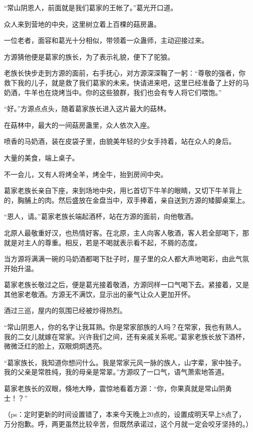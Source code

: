 \begin{this_body}
“常山阴恩人，前面就是我们葛家的王帐了。”葛光开口道。

众人来到营地的中央，这里树立着上百棵的菇房蛊。

一位老者，面容和葛光十分相似，带领着一众蛊师，主动迎接过来。

方源猜他便是葛家的族长，为了表示礼貌，便下了驼狼。

老族长快步走到方源的面前，右手抚心，对方源深深鞠了一躬：“尊敬的强者，你救下我的儿子，就是救了我们葛家的未来。快请进来吧，这里已经准备了上好的马奶酒，牛羊也在烧烤当中。你的这些狼群，我们也会有专人将它们喂饱。”

“好。”方源点点头，随着葛家族长进入这片最大的菇林。

在菇林中，最大的一间菇房蛊里，众人依次入座。

喷香的马奶酒，装在皮袋子里，由貌美年轻的少女手持着，站在众人的身后。

大量的美食，端上桌子。

不一会儿，又有人将烤全羊，烤全牛，抬到房间中央。

葛家老族长亲自下座，来到场地中央，用匕首切下牛羊的眼睛，又切下牛羊背上的，胸脯上的肉。然后盛放在金盘当中，双手捧着，亲自送到方源的矮脚桌案上。

“恩人，请。”葛家老族长端起酒杯，站在方源的面前，向他敬酒。

北原人最敬重好汉，也热情好客。在北原，主人向客人敬酒，客人若全部喝下，那就是对主人的尊重。相反，若是不喝就表示看不起，不屑的态度。

当方源将满满一碗的马奶酒都喝下肚子时，屋子里的众人都大声地喝彩，由此气氛开始升温。

葛家老族长敬过之后，便是葛光接着敬酒，方源同样一口气喝下去。紧接着，又是其他家老敬酒。方源无不满饮，显示出的豪气让众人更加开怀。

酒过三巡，屋内的氛围已经被炒得热烈。

“常山阴恩人，你的名字让我耳熟。你是常家部族的人吗？在常家，我也有熟人。我的二女儿就嫁在常家。兴许我们之间，还有亲戚关系呢。”葛家老族长放下酒杯，微微泛红的脸上，双眼炯炯透亮。

“葛家族长，我知道你想问什么。我是常家元风一脉的族人，山字辈，家中独子。我的父亲是常胜纯，我的母亲是常翠。”方源叹了一口气，语气萧索地答道。

葛家老族长的双眼，倏地大睁，震惊地看着方源：“你，你果真就是常山阴勇士！？”

（ps：定时更新的时间设置错了，本来今天晚上20点的，设置成明天早上8点了，万分抱歉。呼，两更虽然比较辛苦，但既然承诺过，这个月就一定会咬牙坚持的。）

\end{this_body}

